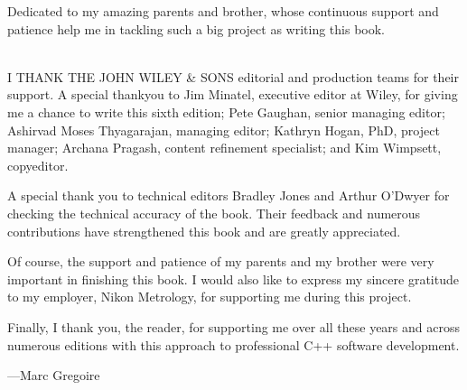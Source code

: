 Dedicated to my amazing parents and brother, whose continuous support and patience help me in tackling such a big project as writing this book.

\hspace*{\fill} \\

I THANK THE JOHN WILEY \& SONS editorial and production teams for their support. A special thankyou to Jim Minatel, executive editor at Wiley, for giving me a chance to write this sixth edition; Pete Gaughan, senior managing editor; Ashirvad Moses Thyagarajan, managing editor; Kathryn Hogan, PhD, project manager; Archana Pragash, content refinement specialist; and Kim Wimpsett, copyeditor.

A special thank you to technical editors Bradley Jones and Arthur O’Dwyer for checking the technical accuracy of the book. Their feedback and numerous contributions have strengthened this book and are greatly appreciated.

Of course, the support and patience of my parents and my brother were very important in finishing this book. I would also like to express my sincere gratitude to my employer, Nikon Metrology, for supporting me during this project.

Finally, I thank you, the reader, for supporting me over all these years and across numerous editions with this approach to professional C++ software development.

\begin{flushright}
—Marc Gregoire
\end{flushright}
